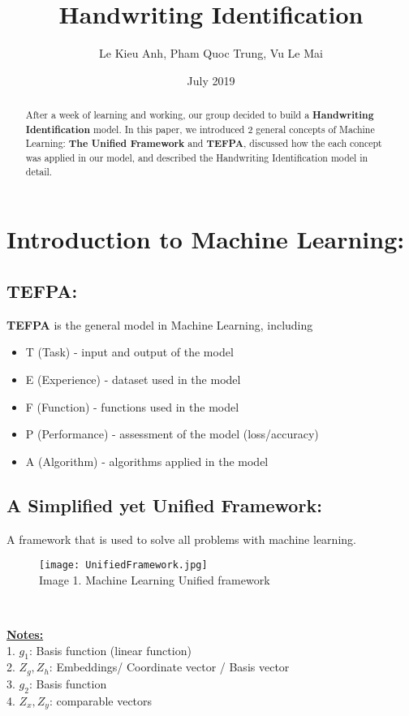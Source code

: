 \documentclass{article}
\title{Handwriting Identification}
\author{Le Kieu Anh, Pham Quoc Trung, Vu Le Mai}
\date{July 2019}
\begin{document}
\maketitle

\begin{abstract}
After a week of learning and working, our group decided to build a \textbf{Handwriting Identification} model. In this paper, we introduced 2 general concepts of Machine Learning: \textbf{The Unified Framework} and \textbf{TEFPA}, discussed how the each concept was applied in our model, and described the Handwriting Identification model in detail.
\end{abstract}

\tableofcontents
\newpage

\section{Introduction to Machine Learning:}
\subsection{TEFPA:}
\textbf{TEFPA} is the general model in Machine Learning, including 
\begin{itemize}
    \item T (Task) - input and output of the model
    \item E (Experience) - dataset used in the model
    \item F (Function) - functions used in the model
    \item P (Performance) - assessment of the model (loss/accuracy)
    \item A (Algorithm) - algorithms applied in the model
\end{itemize}

\subsection{A Simplified yet Unified Framework:}
A framework that is used to solve all problems with machine learning.\\

\begin{figure}[h!]
\centering\texttt{[image: UnifiedFramework.jpg]}
\\Image 1. Machine Learning Unified framework\\
\end{figure}\

\underline {\textbf{Notes:}} \\
1. $g_1$: Basis function (linear function)\\
2. $Z_g, Z_h$: Embeddings/ Coordinate vector / Basis vector \\
3. $g_2$: Basis function \\
4. $Z_x, Z_y$: comparable vectors\\
\end{document}
